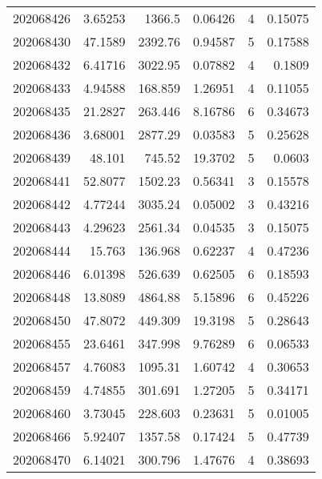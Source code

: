 \begin{tabular}{rrrrrr}
 202068426 &          3.65253 &     1366.5    &            0.06426 &           4 & 0.15075 \\
 202068430 &         47.1589  &     2392.76   &            0.94587 &           5 & 0.17588 \\
 202068432 &          6.41716 &     3022.95   &            0.07882 &           4 & 0.1809  \\
 202068433 &          4.94588 &      168.859  &            1.26951 &           4 & 0.11055 \\
 202068435 &         21.2827  &      263.446  &            8.16786 &           6 & 0.34673 \\
 202068436 &          3.68001 &     2877.29   &            0.03583 &           5 & 0.25628 \\
 202068439 &         48.101   &      745.52   &           19.3702  &           5 & 0.0603  \\
 202068441 &         52.8077  &     1502.23   &            0.56341 &           3 & 0.15578 \\
 202068442 &          4.77244 &     3035.24   &            0.05002 &           3 & 0.43216 \\
 202068443 &          4.29623 &     2561.34   &            0.04535 &           3 & 0.15075 \\
 202068444 &         15.763   &      136.968  &            0.62237 &           4 & 0.47236 \\
 202068446 &          6.01398 &      526.639  &            0.62505 &           6 & 0.18593 \\
 202068448 &         13.8089  &     4864.88   &            5.15896 &           6 & 0.45226 \\
 202068450 &         47.8072  &      449.309  &           19.3198  &           5 & 0.28643 \\
 202068455 &         23.6461  &      347.998  &            9.76289 &           6 & 0.06533 \\
 202068457 &          4.76083 &     1095.31   &            1.60742 &           4 & 0.30653 \\
 202068459 &          4.74855 &      301.691  &            1.27205 &           5 & 0.34171 \\
 202068460 &          3.73045 &      228.603  &            0.23631 &           5 & 0.01005 \\
 202068466 &          5.92407 &     1357.58   &            0.17424 &           5 & 0.47739 \\
 202068470 &          6.14021 &      300.796  &            1.47676 &           4 & 0.38693 \\

\end{tabular}

